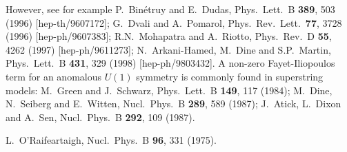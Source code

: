 \documentclass[11pt]{article}
\begin{document}
\begin{thebibliography}{999}
 However, see for example
P.~Bin\'etruy and  E.~Dudas, 
  Phys.\ Lett.\ B {\bf 389}, 503 (1996)
  [hep-th/9607172];
G.~Dvali and A.~Pomarol, 
  Phys.\ Rev.\ Lett.\  {\bf 77}, 3728 (1996)
  [hep-ph/9607383];
R.N.~Mohapatra and A.~Riotto, 
  Phys.\ Rev.\ D {\bf 55}, 4262 (1997)
  [hep-ph/9611273];
N.~Arkani-Hamed, M.~Dine and S.P.~Martin,
  Phys.\ Lett.\ B {\bf 431}, 329 (1998)
  [hep-ph/9803432].
A non-zero Fayet-Iliopoulos term for an anomalous $U(1)$ symmetry
is commonly found in superstring models:
M.~Green and J.~Schwarz, 
  Phys.\ Lett.\ B {\bf 149}, 117 (1984);
M.~Dine, N.~Seiberg and E.~Witten, 
  Nucl.\ Phys.\ B {\bf 289}, 589 (1987);
J.~Atick, L.~Dixon and A.~Sen, 
  Nucl.\ Phys.\ B {\bf 292}, 109 (1987).

L.~O'Raifeartaigh, 
  Nucl.\ Phys.\ B {\bf 96}, 331 (1975).


\end{thebibliography}
\end{document}
